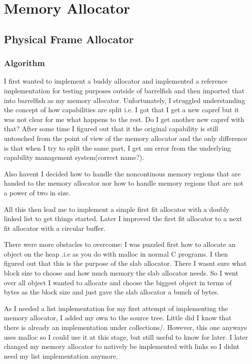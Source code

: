 \chapter{Memory Allocator}

\section{Physical Frame Allocator}

\subsection{Algorithm}

I first wanted to implement a buddy allocator and implemented a reference
implementation for testing purposes outside of barrelfish and then imported that
into barrelfish as my memory allocator. Unfortunately, I struggled understanding
the concept of how capabilities are split i.e. I got that I get a new capref but
it was not clear for me what happens to the rest. Do I get another new capref
with that? After some time I figured out that it the original capability is
still untouched from the point of view of the memory allocator and the only
difference is that when I try to split the same part, I get am error from the
underlying capability management system(correct name?).

Also havent I decided how to handle the noncontinous memory regions that are
handed to the memory allocator nor how to handle memory regions that are not a
power of two in size.

All this then lead me to implement a simple first fit allocator with a doubly
linked list to get things started. Later I improved the first fit allocator to a
next fit allocator with a circular buffer.

There were more obstacles to overcome: I was puzzled first how to allocate an
object on the heap .i.e as you do with malloc in normal C programs. I then
figured out that this is the purpose of the slab allocator. There I wasnt sure
what block size to choose and how much memory the slab allocator needs. So I
went over all object I wanted to allocate and choose the biggest object in terms
of bytes as the block size and just gave the slab allocator a bunch of bytes.

As I needed a list implementation for my first attempt of implementing the
memory allocator, I added my own to the source tree. Little did I know that
there is already an implementation under collections/. However, this one anyways
uses malloc so I could use it at this stage, but still useful to know for later.
I later changed my memory allocator to natively be implemented with links so I
didnt need my list implementation anymore.

